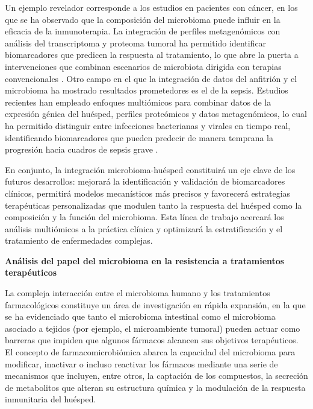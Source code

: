 Un ejemplo revelador corresponde a los estudios en pacientes con cáncer, en los que se ha observado que la composición del microbioma puede influir en la eficacia de la inmunoterapia. La integración de perfiles metagenómicos con análisis del transcriptoma y proteoma tumoral ha permitido identificar biomarcadores que predicen la respuesta al tratamiento, lo que abre la puerta a intervenciones que combinan escenarios de microbiota dirigida con terapias convencionales \cite{goyal2025understanding}. Otro campo en el que la integración de datos del anfitrión y el microbioma ha mostrado resultados prometedores es el de la sepsis. Estudios recientes han empleado enfoques multiómicos para combinar datos de la expresión génica del huésped, perfiles proteómicos y datos metagenómicos, lo cual ha permitido distinguir entre infecciones bacterianas y virales en tiempo real, identificando biomarcadores que pueden predecir de manera temprana la progresión hacia cuadros de sepsis grave \cite{lu2025multi}.

En conjunto, la integración microbioma-huésped constituirá un eje clave de los futuros desarrollos: mejorará la identificación y validación de biomarcadores clínicos, permitirá modelos mecanísticos más precisos y favorecerá estrategias terapéuticas personalizadas que modulen tanto la respuesta del huésped como la composición y la función del microbioma. Esta línea de trabajo acercará los análisis multiómicos a la práctica clínica y optimizará la estratificación y el tratamiento de enfermedades complejas.


\textbf{Análisis del papel del microbioma en la resistencia a tratamientos terapéuticos} 


La compleja interacción entre el microbioma humano y los tratamientos farmacológicos constituye un área de investigación en rápida expansión, en la que se ha evidenciado que tanto el microbioma intestinal como el microbioma asociado a tejidos (por ejemplo, el microambiente tumoral) pueden actuar como barreras que impiden que algunos fármacos alcancen sus objetivos terapéuticos. El concepto de farmacomicrobiómica abarca la capacidad del microbioma para modificar, inactivar o incluso reactivar los fármacos mediante una serie de mecanismos que incluyen, entre otros, la captación de los compuestos, la secreción de metabolitos que alteran su estructura química y la modulación de la respuesta inmunitaria del huésped.

